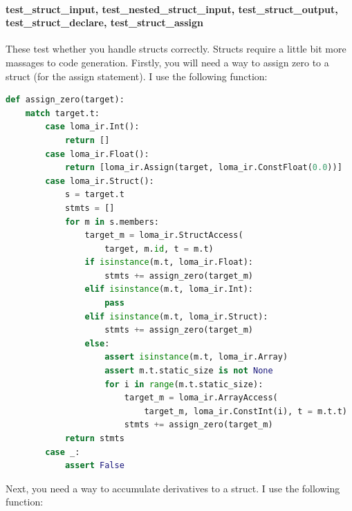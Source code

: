 \paragraph{test_struct_input, test_nested_struct_input, test_struct_output, test_struct_declare, test_struct_assign} These test whether you handle structs correctly. Structs require a little bit more massages to code generation. Firstly, you will need a way to assign zero to a struct (for the assign statement). I use the following function:
\begin{lstlisting}[language=Python]
def assign_zero(target):
    match target.t:
        case loma_ir.Int():
            return []
        case loma_ir.Float():
            return [loma_ir.Assign(target, loma_ir.ConstFloat(0.0))]
        case loma_ir.Struct():
            s = target.t
            stmts = []
            for m in s.members:
                target_m = loma_ir.StructAccess(
                    target, m.id, t = m.t)
                if isinstance(m.t, loma_ir.Float):
                    stmts += assign_zero(target_m)
                elif isinstance(m.t, loma_ir.Int):
                    pass
                elif isinstance(m.t, loma_ir.Struct):
                    stmts += assign_zero(target_m)
                else:
                    assert isinstance(m.t, loma_ir.Array)
                    assert m.t.static_size is not None
                    for i in range(m.t.static_size):
                        target_m = loma_ir.ArrayAccess(
                            target_m, loma_ir.ConstInt(i), t = m.t.t)
                        stmts += assign_zero(target_m)
            return stmts
        case _:
            assert False
\end{lstlisting}
Next, you need a way to accumulate derivatives to a struct. I use the following function:

